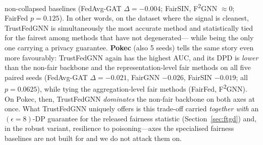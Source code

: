 \documentclass[pdflatex,sn-mathphys-num]{sn-jnl}
\theoremstyle{thmstyleone}%
\theoremstyle{thmstyletwo}%
\theoremstyle{thmstylethree}%
\begin{document}
non-collapsed baselines (FedAvg-GAT $\Delta{=}-0.004$; FairSIN, F\textsuperscript{2}GNN
$\approx 0$; FairFed $p{=}0.125$). In other words, on the dataset where the
signal is cleanest, TrustFedGNN is simultaneously the most accurate method and
statistically tied for the fairest among methods that have not degenerated---
while being the only one carrying a privacy guarantee. \textbf{Pokec} (also 5
seeds) tells the same story even more favourably: TrustFedGNN again has the
highest AUC, and its DPD is \emph{lower} than the non-fair backbone and the
representation-level fair methods on all five paired seeds
(FedAvg-GAT $\Delta{=}-0.021$, FairGNN $-0.026$, FairSIN $-0.019$; all
$p{=}0.0625$), while tying the aggregation-level fair methods (FairFed, F\textsuperscript{2}GNN).
On Pokec, then, TrustFedGNN \emph{dominates} the non-fair backbone on both axes
at once. What TrustFedGNN uniquely offers is this trade-off carried
\emph{together with} an $(\epsilon{=}8)$-DP guarantee for the released fairness
statistic (Section~\ref{sec:ftgd}) and, in the robust variant, resilience to
poisoning---axes the specialised fairness baselines are not built for and we do
not attack them on.

\begin{table}[t]\centering
\caption{Paired Wilcoxon signed-rank tests (TrustFedGNN vs.\ each baseline over
shared seeds): $p$-values, $^{*}$ marks $p<0.05$. ``--'' where fewer than five
shared seeds are available (Credit/Elliptic remain at 2--3 seeds by cost). Note
the Wilcoxon floor: at $n{=}5$ (Bail, Pokec) the smallest attainable $p$ is
$0.0625$, so a uniform $0.06$ indicates our method wins on \emph{all five} paired
seeds, not a weak effect. On German (10 seeds) TrustFedGNN's DPD is \emph{not}
significantly different from the non-fair backbone or most fair baselines; its
AUC is significantly higher than the other (collapsing) privacy methods and lower
than the non-private ones. On Bail its AUC beats every baseline on all seeds
while its DPD ties the fairest non-collapsed methods; on Pokec it beats the
backbone on \emph{both} axes on all seeds.}
\label{tab:significance}
{\footnotesize\setlength{\tabcolsep}{4pt}}
\end{table}
\end{document}
